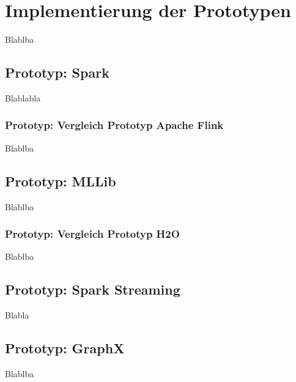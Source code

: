\chapter{Implementierung der Prototypen }
\label{chapter:implementierung}



Blablba

\section{Prototyp: Spark}
\label{section:prototyp spark}

Blablabla

\subsection{Prototyp: Vergleich Prototyp Apache Flink }
\label{section:vergleich apache flink}

Blablba

\section{Prototyp: MLLib }
\label{section:prototyp mllib}

Blablba

\subsection{Prototyp: Vergleich Prototyp H2O }
\label{section:vergleich h2o}

Blablba


\section{Prototyp: Spark Streaming }
\label{section:prototyp spark streaming}

Blabla



\section{Prototyp: GraphX}
\label{section:prototyp graphX}

Blablba


